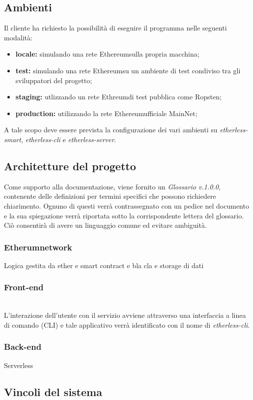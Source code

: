 \subsection{Ambienti}
Il cliente ha richiesto la possibilità di eseguire il programma nelle seguenti modalità:
\begin{itemize}
	\item \textbf{locale:} simulando una rete Ethereum\glo sulla propria macchina;
	\item \textbf{test:} simulando una rete Ethereum\glo su un ambiente di test condiviso tra gli sviluppatori del progetto;
	\item \textbf{staging:} utlizzando un rete Ethreum\glo di test pubblica come Ropsten\glo;
	\item \textbf{production:} utilizzando la rete Ethereum\glo ufficiale MainNet\glo;
\end{itemize}
A tale scopo deve essere prevista la configurazione dei vari ambienti su \textit{etherless-smart}, \textit{etherless-cli} e \textit{etherless-server}.
\subsection{Architetture del progetto}
Come supporto alla documentazione, viene fornito un \textit{Glossario v.1.0.0}, contenente delle definizioni per termini specifici che possono richiedere chiarimento. Ognuno di questi verrà contrassegnato con un pedice \glo nel documento e la sua spiegazione verrà riportata sotto la corrispondente lettera del glossario. Ciò consentirà di avere un linguaggio comune ed evitare ambiguità. 
\subsubsection{Etherum\glo network}
	Logica gestita da ether e smart contract e bla cla e storage di dati
\subsubsection{Front-end}
	\\L'interazione dell'utente con il servizio avviene attraverso una interfaccia a linea di comando (CLI\glo) e tale applicativo verrà identificato con il nome di \textit{etherless-cli}.
\subsubsection{Back-end}
	Serverless
\subsection{Vincoli del sistema}


	
	
	